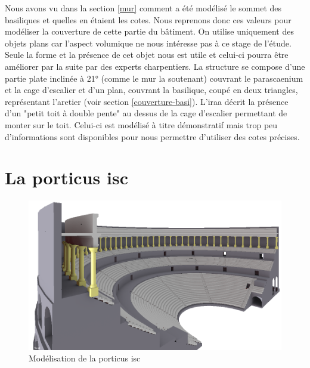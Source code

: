 Nous avons vu dans la section \ref{mur} comment a été modélisé le sommet des \glspl{basilique} et quelles en étaient les cotes. Nous reprenons donc ces valeurs pour modéliser la couverture de cette partie du bâtiment. On utilise uniquement des objets plans car l'aspect volumique ne nous intéresse pas à ce stage de l'étude. Seule la forme et la présence de cet objet nous est utile et celui-ci pourra être améliorer par la suite par des experts charpentiers. La structure se compose d'une partie plate inclinée à 21° (comme le mur la soutenant) couvrant le \gls{parascaenium} et la cage d'escalier et d'un plan, couvrant la \gls{basilique}, coupé en deux triangles, représentant l'\gls{aretier} (voir section \ref{couverture-basi}). L'\gls{iraa} décrit la présence d'un "petit toit à double pente" \cite[p. 34]{orangeTxt} au dessus de la cage d'escalier permettant de monter sur le toit. Celui-ci est modélisé à titre démonstratif mais trop peu d'informations sont disponibles pour nous permettre d'utiliser des cotes précises.


\section{La \gls{porticus isc}}

\begin{figure}[!h]
	\includegraphics[width=\linewidth]{images/modPorticus}
	\caption{Modélisation de la \gls{porticus isc}} 
	\label{modPorticus} 
\end{figure} 

